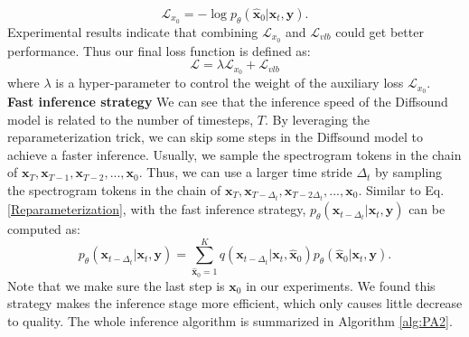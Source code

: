\documentclass[lettersize,journal]{IEEEtran}
\begin{document}
\begin{equation}\label{noiseless loss}
  \mathcal{L}_{x_0} = -\log p_{\theta}(\hat{\boldsymbol{x}}_0|\boldsymbol{x}_t,\boldsymbol{y}).
\end{equation}
Experimental results indicate that combining $\mathcal{L}_{x_0}$ and $\mathcal{L}_{vlb}$ could get better performance. Thus our final loss function is defined as:
\begin{equation}\label{diffu final loss}
  \mathcal{L} = \lambda\mathcal{L}_{x_0} + \mathcal{L}_{vlb}
\end{equation}
where $\lambda$ is a hyper-parameter to control the weight of the auxiliary loss $\mathcal{L}_{x_0}$.\\
\textbf{Fast inference strategy} We can see that the inference speed of the Diffsound model is related to the number of timesteps, $T$. By leveraging the reparameterization trick, we can skip some steps in the Diffsound model to achieve a faster inference. Usually, we sample the spectrogram tokens in the chain of $\boldsymbol{x}_T, \boldsymbol{x}_{T-1}, \boldsymbol{x}_{T-2}, ..., \boldsymbol{x}_{0}$. Thus, we can use a larger time stride $\Delta_{t}$ by sampling the spectrogram tokens in the chain of $\boldsymbol{x}_T, \boldsymbol{x}_{T-\Delta_{t}}, \boldsymbol{x}_{T-2\Delta_{t}}, ..., \boldsymbol{x}_{0}$. 
{\color{black}Similar to Eq.\ref{Reparameterization}, with the fast inference strategy,  $p_\theta(\boldsymbol{x}_{t-\Delta_t}|\boldsymbol{x}_t, \boldsymbol{y})$ can be computed as:
\begin{equation}\label{Reparameterization2}
	p_{\theta}(\boldsymbol{x}_{t-\Delta_t}|\boldsymbol{x}_t,\boldsymbol{y})=\sum_{\hat{\boldsymbol{x}}_0=1}^{K} q(\boldsymbol{x}_{t-\Delta_t}|\boldsymbol{x}_t,\hat{\boldsymbol{x}}_0) p_{\theta}(\hat{\boldsymbol{x}}_0|\boldsymbol{x}_t,\boldsymbol{y}).
\end{equation}
{Note that we make sure the last step is $\boldsymbol{x}_{0}$ in our experiments}}. We found this strategy makes the inference stage more efficient, which only causes little decrease to quality. The whole inference algorithm is summarized in Algorithm \ref{alg:PA2}.\\
\end{document}
